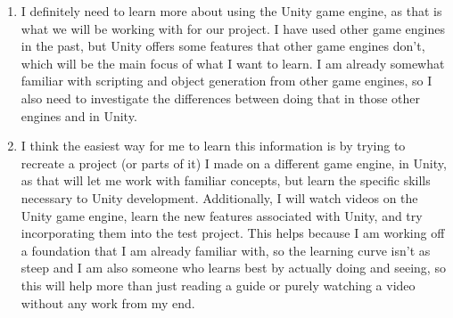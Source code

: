 \documentclass{article}
\begin{document}
\begin{enumerate}
\item I definitely need to learn more about using the Unity game engine, as that is what we will be working with for our project. I have used other game engines in the past, but Unity offers some features that other game engines don't, which will be the main focus of what I want to learn. I am already somewhat familiar with scripting and object generation from other game engines, so I also need to investigate the differences between doing that in those other engines and in Unity.
\item I think the easiest way for me to learn this information is by trying to recreate a project (or parts of it) I made on a different game engine, in Unity, as that will let me work with familiar concepts, but learn the specific skills necessary to Unity development. Additionally, I will watch videos on the Unity game engine, learn the new features associated with Unity, and try incorporating them into the test project. This helps because I am working off a foundation that I am already familiar with, so the learning curve isn't as steep and I am also someone who learns best by actually doing and seeing, so this will help more than just reading a guide or purely watching a video without any work from my end.
\end{enumerate}
\end{document}
